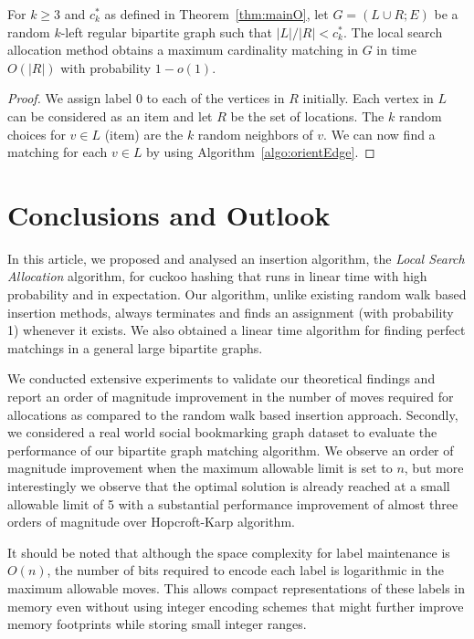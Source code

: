 \begin{corollary}
For $k\ge 3$ and $c^*_{k}$ as defined in Theorem~\ref{thm:mainO}, let $G=(L\cup R;E)$ be a random $k$-left regular bipartite graph such that ${|L| / |R| }<c^*_{k}$.  The local search allocation method obtains a maximum cardinality matching in $G$ in time $O(|R|)$ with probability $1-o(1)$.
\end{corollary}
\begin{proof}
We assign label $0$ to each of the vertices in $R$ initially. Each vertex in $L$ can be considered as an item and let $R$ be the set of locations. The $k$ random choices for $v\in L$ (item) are the $k$ random neighbors of $v$. We can now find a matching for each $v\in L$ by using Algorithm~\ref{algo:orientEdge}.
\end{proof}



\section{Conclusions and Outlook}
\label{chap:conc}

In this article, we proposed and analysed an insertion algorithm, the \emph{Local Search Allocation} algorithm, for cuckoo hashing that runs in linear time with high probability and in expectation. Our algorithm, unlike existing random walk based insertion methods, always terminates and finds an assignment (with probability 1) whenever it exists. We also obtained a linear time algorithm for finding perfect matchings in a general large bipartite graphs.

We conducted extensive experiments to validate our theoretical findings and report an order of magnitude improvement in the number of moves required for allocations as compared to the random walk based insertion approach. Secondly, we considered a real world social bookmarking graph dataset to evaluate the performance of our bipartite graph matching algorithm. We observe an order of magnitude improvement when the maximum allowable limit is set to $n$, but more interestingly we observe that the optimal solution is already reached at a small allowable limit of 5 with a substantial performance improvement of almost three orders of magnitude over Hopcroft-Karp algorithm.

It should be noted that although the space complexity for label maintenance is $O(n)$, the number of bits required to encode each label is logarithmic in the maximum allowable moves. This allows compact representations of these labels in memory even without using integer encoding schemes that might further improve memory footprints while storing small integer ranges.

